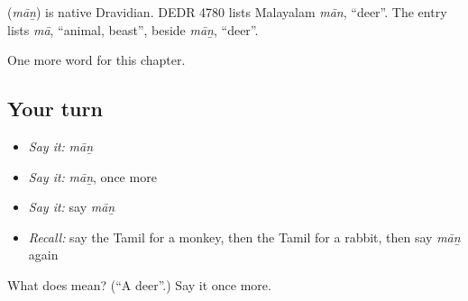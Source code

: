 \begin{cousinweb}
\textbf{} (\emph{māṉ}) is native Dravidian. DEDR 4780 lists Malayalam \emph{mān}, \textquotedblleft{}deer\textquotedblright{}. The entry lists \emph{mā}, \textquotedblleft{}animal, beast\textquotedblright{}, beside \emph{māṉ}, \textquotedblleft{}deer\textquotedblright{}.
\end{cousinweb}

\begin{grammarlens}[title={What you've built}]
One more word for this chapter.
\end{grammarlens}

\subsection*{Your turn}
\begin{itemize}
\raggedright
  \item \emph{Say it:} \emph{māṉ}
  \item \emph{Say it:} \emph{māṉ}, once more
  \item \emph{Say it:} say \emph{māṉ}
  \item \emph{Recall:} say the Tamil for a monkey, then the Tamil for a rabbit, then say \emph{māṉ} again
\end{itemize}

\begin{tcolorbox}[breakable,colback=teal!4,colframe=teal!35!black,title={Before you move on}]
What does  mean? (\textquotedblleft{}A deer\textquotedblright{}.) Say it once more.
\end{tcolorbox}
